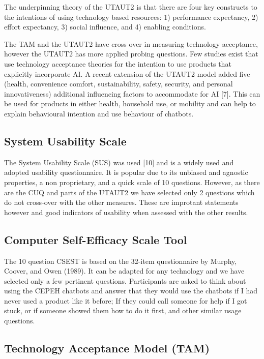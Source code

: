 \documentclass[a4paper, nobind]{templates/ociamthesis}
\begin{document}
The underpinning theory of the UTAUT2 is that there are four key constructs to the intentions of using technology based resources: 1) performance expectancy, 2) effort expectancy, 3) social influence, and 4) enabling conditions.

The TAM and the UTAUT2 have cross over in measuring technology acceptance, however the UTAUT2 has more applied probing questions.
Few studies exist that use technology acceptance theories for the intention to use products that explicitly incorporate AI.
A recent extension of the UTAUT2 model added five (health, convenience comfort, sustainability, safety, security, and personal innovativeness) additional influencing factors to accommodate for AI {[}7{]}.
This can be used for products in either health, household use, or mobility and can help to explain behavioural intention and use behaviour of chatbots.

\hypertarget{system-usability-scale}{%
\subsection{System Usability Scale}\label{system-usability-scale}}

The System Usability Scale (SUS) was used {[}10{]} and is a widely used and adopted usability questionnaire.
It is popular due to its unbiased and agnostic properties, a non proprietary, and a quick scale of 10 questions. However, as there are the CUQ and parts of the UTAUT2 we have selected only 2 questions which do not cross-over with the other measures. These are improtant statements however and good indicators of usability when assessed with the other results.

\hypertarget{computer-self-efficacy-scale-tool}{%
\subsection{Computer Self-Efficacy Scale Tool}\label{computer-self-efficacy-scale-tool}}

The 10 question CSEST is based on the 32-item questionnaire by Murphy, Coover, and Owen (1989). It can be adapted for any technology and we have selected only a few pertinent questions. Participants are asked to think about using the CEPEH chatbots and answer that they would use the chatbots if I had never used a product like it before; If they could call someone for help if I got stuck, or if someone showed them how to do it first, and other similar usage questions.

\hypertarget{technology-acceptance-model-tam}{%
\subsection{Technology Acceptance Model (TAM)}\label{technology-acceptance-model-tam}}
\end{document}
